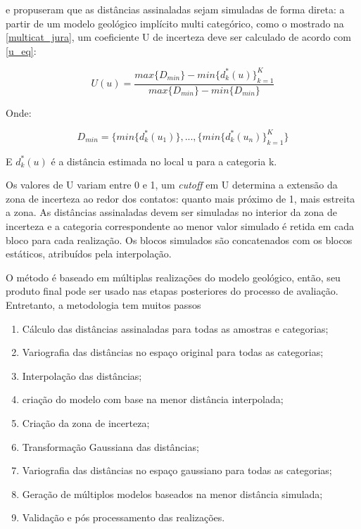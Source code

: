 \label{sim_direta}

 e  propuseram que as distâncias assinaladas sejam simuladas de forma direta: a partir de um modelo geológico implícito multi categórico, como o mostrado na \autoref{multicat_jura}, um coeficiente U de incerteza deve ser calculado de acordo com \autoref{u_eq}:

\begin{equation}\label{u_eq}
    U(u)=\frac{max\{D_{min}\}-min\{d^*_k(u)\}^K_{k=1}}{max\{D_{min}\}-min\{D_{min}\}}
\end{equation}

Onde:

\begin{equation}
    D_{min}=\{min\{d^*_k(u_1)\},...,\{min\{d^*_k(u_n)\}^K_{k=1}\}
\end{equation}

E $d^*_k(u)$ é a distância estimada no local u para a categoria k.

Os valores de U variam entre 0 e 1, um \textit{cutoff} em U determina a extensão da zona de incerteza ao redor dos contatos: quanto mais próximo de 1, mais estreita a zona. As distâncias assinaladas devem ser simuladas no interior da zona de incerteza e a categoria correspondente ao menor valor simulado é retida em cada bloco para cada realização. Os blocos simulados são concatenados com os blocos estáticos, atribuídos pela interpolação.

O método é baseado em múltiplas realizações do modelo geológico, então, seu produto final pode ser usado nas etapas posteriores do processo de avaliação. Entretanto, a metodologia tem muitos passos \cite{radtke_dissertacao}

\begin{enumerate}[label=\roman*]
\item Cálculo das distâncias assinaladas para todas as amostras e categorias;
\item Variografia das distâncias no espaço original para todas as categorias;
\item Interpolação das distâncias; 
\item criação do modelo com base na menor distância interpolada;
\item Criação da zona de incerteza;
\item Transformação Gaussiana das distâncias;
\item Variografia das distâncias no espaço gaussiano para todas as categorias;
\item Geração de múltiplos modelos baseados na menor distância simulada;
\item Validação e pós processamento das realizações.
\end{enumerate}

